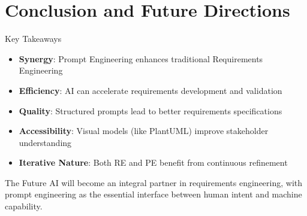 \documentclass{beamer}
\begin{document}
\section{Conclusion and Future Directions}

\begin{frame}[t]{Key Takeaways}
    \begin{itemize}
        \item \textbf{Synergy}: Prompt Engineering enhances traditional Requirements Engineering
        \item \textbf{Efficiency}: AI can accelerate requirements development and validation
        \item \textbf{Quality}: Structured prompts lead to better requirements specifications
        \item \textbf{Accessibility}: Visual models (like PlantUML) improve stakeholder understanding
        \item \textbf{Iterative Nature}: Both RE and PE benefit from continuous refinement
    \end{itemize}
    
    \begin{block}{The Future}
        AI will become an integral partner in requirements engineering, with prompt engineering as the essential interface between human intent and machine capability.
    \end{block}
\end{frame}

\end{document}
